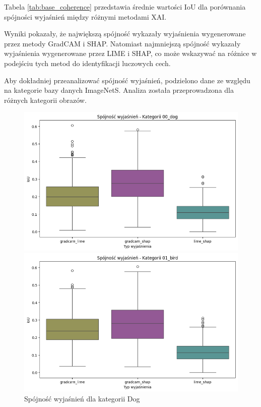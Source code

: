 Tabela \ref{tab:base_coherence} przedstawia średnie wartości IoU dla porównania spójności wyjaśnień między różnymi metodami XAI.

Wyniki pokazały, że największą spójność wykazały wyjaśnienia wygenerowane przez metody GradCAM i SHAP.
Natomiast najmniejszą spójność wykazały wyjaśnienia wygenerowane przez LIME i SHAP, co może wskazywać na różnice w podejściu tych metod do identyfikacji luczowych cech.

Aby dokładniej przeanalizować spójność wyjaśnień, podzielono dane ze względu na kategorie bazy danych ImageNetS.
Analiza została przeprowadzona dla różnych kategorii obrazów.

\begin{figure}
	\centering
	\begin{minipage}[b]{0.3\textwidth}
		\includegraphics[width=.9\textwidth]{img/base_coherence_dog}
		\caption{Spójność wyjaśnień dla kategorii Dog}  \label{}
	\end{minipage}
	\begin{minipage}[b]{0.3\textwidth}
		\centering\includegraphics[width=.9\textwidth]{img/base_coherence_bird}

\end{minipage}
\end{figure}
